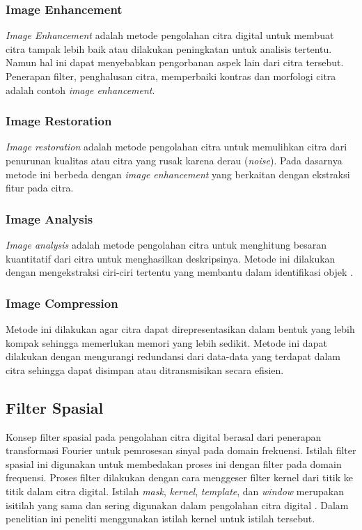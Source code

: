 \subsubsection{Image Enhancement}
\textit{Image Enhancement} adalah metode pengolahan citra digital untuk membuat citra tampak lebih baik atau dilakukan peningkatan untuk analisis tertentu. Namun hal ini dapat menyebabkan pengorbanan aspek lain dari citra tersebut. Penerapan filter, penghalusan citra, memperbaiki kontras dan morfologi citra adalah contoh \textit{image enhancement}.

\subsubsection{Image Restoration}
\textit{Image restoration} adalah metode pengolahan citra untuk memulihkan citra dari penurunan kualitas atau citra yang rusak karena derau (\textit{noise}). Pada dasarnya metode ini berbeda dengan \textit{image enhancement} yang berkaitan dengan ekstraksi fitur pada citra. 

\subsubsection{Image Analysis}
\textit{Image analysis} adalah metode pengolahan citra untuk menghitung besaran kuantitatif dari citra untuk menghasilkan deskripsinya. Metode ini dilakukan dengan mengekstraksi ciri-ciri tertentu yang membantu dalam identifikasi objek \cite{book:dasilva}.

\subsubsection{Image Compression}
Metode ini dilakukan agar citra dapat direpresentasikan dalam bentuk yang lebih kompak sehingga memerlukan memori yang lebih sedikit. Metode ini dapat dilakukan dengan mengurangi redundansi dari data-data yang terdapat dalam citra sehingga dapat disimpan atau ditransmisikan secara efisien.


\subsection{Filter Spasial}
Konsep filter spasial pada pengolahan citra digital berasal dari penerapan transformasi Fourier untuk pemrosesan sinyal pada domain frekuensi. Istilah filter spasial ini digunakan untuk membedakan proses ini dengan filter pada domain frequensi. Proses filter dilakukan dengan cara menggeser filter kernel dari titik ke titik dalam citra digital. Istilah \textit{mask}, \textit{kernel}, \textit{template}, dan \textit{window} merupakan isitilah yang sama dan sering digunakan dalam pengolahan citra digital \cite{book:gonzalez}. Dalam penelitian ini peneliti menggunakan istilah kernel untuk istilah tersebut.

